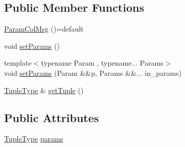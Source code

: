 \subsection*{Public Member Functions}
\begin{DoxyCompactItemize}
\item 
\hyperlink{structvt_1_1vrt_1_1collection_1_1_param_col_msg_3_01_tuple_00_01_col_t_00_01std_1_1enable__if__tcc6a1858ebbc12bbfd81f56748245add_a3f158d2bce6804dae653475e383347e8}{Param\+Col\+Msg} ()=default
\item 
void \hyperlink{structvt_1_1vrt_1_1collection_1_1_param_col_msg_3_01_tuple_00_01_col_t_00_01std_1_1enable__if__tcc6a1858ebbc12bbfd81f56748245add_ae637b0bbec304ac77b345779f9e55c44}{set\+Params} ()
\item 
{\footnotesize template$<$typename Param , typename... Params$>$ }\\void \hyperlink{structvt_1_1vrt_1_1collection_1_1_param_col_msg_3_01_tuple_00_01_col_t_00_01std_1_1enable__if__tcc6a1858ebbc12bbfd81f56748245add_a5742af55a6e36a8a2db14b2812878fe2}{set\+Params} (Param \&\&p, Params \&\&... in\+\_\+params)
\item 
\hyperlink{structvt_1_1vrt_1_1collection_1_1_param_col_msg_3_01_tuple_00_01_col_t_00_01std_1_1enable__if__tcc6a1858ebbc12bbfd81f56748245add_a86867847002b70c52126323faa830dd6}{Tuple\+Type} \& \hyperlink{structvt_1_1vrt_1_1collection_1_1_param_col_msg_3_01_tuple_00_01_col_t_00_01std_1_1enable__if__tcc6a1858ebbc12bbfd81f56748245add_afc5714cc55c3b21fb9f1093863ad29b6}{get\+Tuple} ()
\end{DoxyCompactItemize}
\subsection*{Public Attributes}
\begin{DoxyCompactItemize}
\item 
\hyperlink{structvt_1_1vrt_1_1collection_1_1_param_col_msg_3_01_tuple_00_01_col_t_00_01std_1_1enable__if__tcc6a1858ebbc12bbfd81f56748245add_a86867847002b70c52126323faa830dd6}{Tuple\+Type} \hyperlink{structvt_1_1vrt_1_1collection_1_1_param_col_msg_3_01_tuple_00_01_col_t_00_01std_1_1enable__if__tcc6a1858ebbc12bbfd81f56748245add_a47ee6987900090d312f2f23b9d4e10f2}{params}
\end{DoxyCompactItemize}


